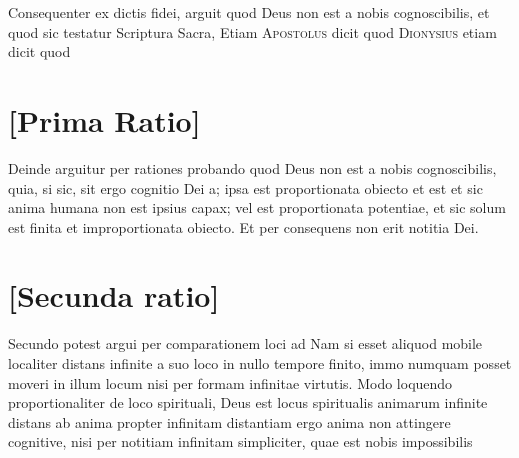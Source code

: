 \documentclass[twoside, openright]{report}
\newcommand{\name}[1]{\textsc{#1}}
\begin{document}
        \pstart
        Consequenter ex dictis fidei, arguit quod Deus non est a nobis cognoscibilis,  et quod  sic testatur Scriptura Sacra,   Etiam \name{Apostolus} dicit quod  \name{Dionysius}  etiam dicit  quod  
        \pend
      
        \bigskip
         \section*{[Prima Ratio]} 
        \pstart
        Deinde arguitur per rationes probando quod Deus non est a nobis cognoscibilis, quia, si sic, sit ergo cognitio  Dei a;   ipsa est proportionata obiecto et  est   et sic anima humana non est ipsius capax; vel est proportionata potentiae, et sic solum est finita et improportionata obiecto. Et per consequens non erit notitia Dei.
        \pend
      
        \bigskip
         \section*{[Secunda ratio]} 
        \pstart
        Secundo  potest argui per comparationem loci ad  Nam si esset aliquod mobile localiter distans infinite a suo loco in nullo tempore finito, immo numquam posset moveri in illum locum nisi per formam infinitae virtutis. Modo loquendo proportionaliter de loco spirituali, Deus est locus spiritualis animarum infinite distans ab anima propter infinitam distantiam  ergo anima non  attingere cognitive, nisi per notitiam infinitam simpliciter, quae est nobis impossibilis  
        \pend
      
\end{document}
